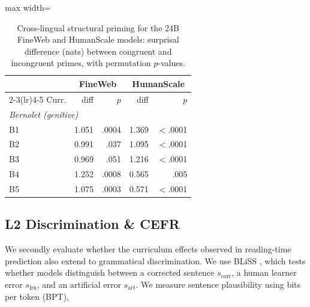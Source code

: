 \documentclass[11pt]{article}
\begin{document}
\begin{table}[h!]
\centering
\small
\setlength{\tabcolsep}{4pt}
\begin{adjustbox}{max width=\columnwidth}
\begin{tabular}{lrrrr}
\toprule
 & \multicolumn{2}{c}{FineWeb} & \multicolumn{2}{c}{HumanScale} \\
\cmidrule(lr){2-3}\cmidrule(lr){4-5}
Curr. & diff & $p$ & diff & $p$ \\
\midrule
\multicolumn{5}{l}{\textit{Bernolet (genitive)}} \\
B1 & 1.051 & .0004 & 1.369 & $<$.0001 \\
B2 & 0.991 & .037  & 1.095 & $<$.0001 \\
B3 & 0.969 & .051  & 1.216 & $<$.0001 \\
B4 & 1.252 & .0008 & 0.565 & .005 \\
B5 & 1.075 & .0003 & 0.571 & $<$.0001 \\
\bottomrule
\end{tabular}
\end{adjustbox}
\caption{Cross-lingual structural priming for the 24B FineWeb and HumanScale models: surprisal difference (nats) between congruent and incongruent primes, with permutation $p$-values. }
\label{tab:beetle-priming}
\end{table}



\subsection{L2 Discrimination \& CEFR}\label{sec:discrimination}

We secondly evaluate whether the curriculum effects observed in reading-time prediction also extend to grammatical discrimination. We use BLiSS \citep{gao2025bliss}, which tests whether models distinguish between a corrected sentence $s_{\mathrm{corr}}$, a human learner error $s_{\mathrm{lrn}}$, and an artificial error $s_{\mathrm{art}}$. We measure sentence plausibility using bits per token (BPT),
\end{document}
